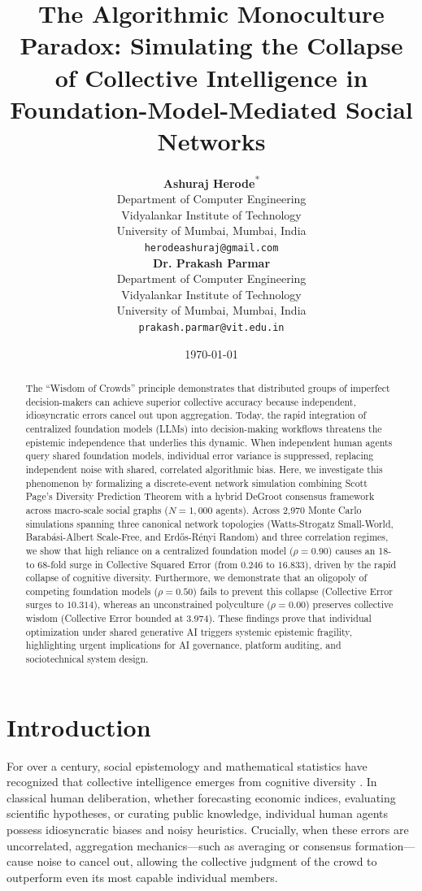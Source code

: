 \documentclass[10pt,twocolumn]{article}
\title{\textbf{The Algorithmic Monoculture Paradox: Simulating the Collapse of Collective Intelligence in Foundation-Model-Mediated Social Networks}}
\author{
    \begin{tabular}[t]{c}
        \textbf{Ashuraj Herode}\textsuperscript{*} \\
        Department of Computer Engineering \\
        Vidyalankar Institute of Technology \\
        University of Mumbai, Mumbai, India \\
        \texttt{herodeashuraj@gmail.com}
    \end{tabular}
    \qquad\qquad
    \begin{tabular}[t]{c}
        \textbf{Dr. Prakash Parmar} \\
        Department of Computer Engineering \\
        Vidyalankar Institute of Technology \\
        University of Mumbai, Mumbai, India \\
        \texttt{prakash.parmar@vit.edu.in}
    \end{tabular}
}
\date{\today}
\begin{document}
\maketitle

\begin{abstract}
The ``Wisdom of Crowds'' principle demonstrates that distributed groups of imperfect decision-makers can achieve superior collective accuracy because independent, idiosyncratic errors cancel out upon aggregation. Today, the rapid integration of centralized foundation models (LLMs) into decision-making workflows threatens the epistemic independence that underlies this dynamic. When independent human agents query shared foundation models, individual error variance is suppressed, replacing independent noise with shared, correlated algorithmic bias. Here, we investigate this phenomenon by formalizing a discrete-event network simulation combining Scott Page's Diversity Prediction Theorem with a hybrid DeGroot consensus framework across macro-scale social graphs ($N = 1,000$ agents). Across 2,970 Monte Carlo simulations spanning three canonical network topologies (Watts-Strogatz Small-World, Barabási-Albert Scale-Free, and Erd\H{o}s-R\'enyi Random) and three correlation regimes, we show that high reliance on a centralized foundation model ($\rho = 0.90$) causes an 18- to 68-fold surge in Collective Squared Error (from $0.246$ to $16.833$), driven by the rapid collapse of cognitive diversity. Furthermore, we demonstrate that an oligopoly of competing foundation models ($\rho = 0.50$) fails to prevent this collapse (Collective Error surges to $10.314$), whereas an unconstrained polyculture ($\rho = 0.00$) preserves collective wisdom (Collective Error bounded at $3.974$). These findings prove that individual optimization under shared generative AI triggers systemic epistemic fragility, highlighting urgent implications for AI governance, platform auditing, and sociotechnical system design.
\end{abstract}

\section{Introduction}
For over a century, social epistemology and mathematical statistics have recognized that collective intelligence emerges from cognitive diversity \cite{galton1907vox, page2007difference}. In classical human deliberation, whether forecasting economic indices, evaluating scientific hypotheses, or curating public knowledge, individual human agents possess idiosyncratic biases and noisy heuristics. Crucially, when these errors are uncorrelated, aggregation mechanics—such as averaging or consensus formation—cause noise to cancel out, allowing the collective judgment of the crowd to outperform even its most capable individual members.
\end{document}

